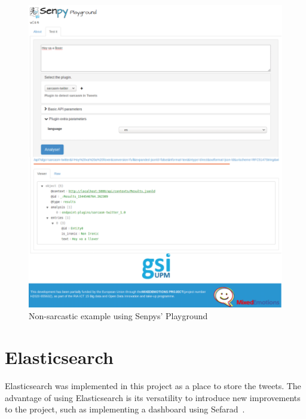 \begin{figure}
	\includegraphics[width=\linewidth]{img/noironia.png}
	\caption{Non-sarcastic example using Senpys' Playground~\cite{senpy}}
	\label{fig:senpyex2}
\end{figure}
\section{Elasticsearch}
Elasticsearch was implemented in this project as a place to store the tweets. The advantage of using Elasticsearch is its versatility to introduce new improvements to the project, such as implementing a dashboard using Sefarad~\cite{sefarad}.
